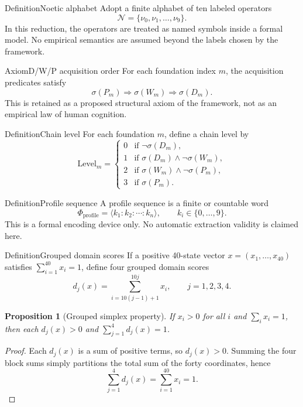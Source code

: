 \documentclass[11pt]{article}
\newcommand{\Noetics}{\mathcal{N}}
\newcommand{\noe}[1]{\nu_{#1}}
\newcommand{\ProfileFrac}{\Phi_{\mathrm{profile}}}
\theoremstyle{plain}
\newtheorem{proposition}{Proposition}
\begin{document}
\begin{claimbox}{Definition}{Noetic alphabet}
Adopt a finite alphabet of ten labeled operators
\[
\Noetics = \{\noe{0},\noe{1},\ldots,\noe{9}\}.
\]
In this reduction, the operators are treated as named symbols inside a formal
model. No empirical semantics are assumed beyond the labels chosen by the
framework.
\end{claimbox}

\begin{claimbox}{Axiom}{D/W/P acquisition order}
For each foundation index $m$, the acquisition predicates satisfy
\[
\sigma(P_m)\Rightarrow \sigma(W_m)\Rightarrow \sigma(D_m).
\]
This is retained as a proposed structural axiom of the framework, not as an
empirical law of human cognition.
\end{claimbox}

\begin{claimbox}{Definition}{Chain level}
For each foundation $m$, define a chain level by
\[
\mathrm{Level}_m =
\begin{cases}
0 & \text{if } \neg \sigma(D_m),\\
1 & \text{if } \sigma(D_m)\land \neg \sigma(W_m),\\
2 & \text{if } \sigma(W_m)\land \neg \sigma(P_m),\\
3 & \text{if } \sigma(P_m).
\end{cases}
\]
\end{claimbox}

\begin{claimbox}{Definition}{Profile sequence}
A profile sequence is a finite or countable word
\[
\ProfileFrac = \langle k_1:k_2:\cdots:k_n\rangle,\qquad k_i\in\{0,\ldots,9\}.
\]
This is a formal encoding device only. No automatic extraction validity is
claimed here.
\end{claimbox}

\begin{claimbox}{Definition}{Grouped domain scores}
If a positive 40-state vector $x=(x_1,\ldots,x_{40})$ satisfies
$\sum_{i=1}^{40}x_i=1$, define four grouped domain scores
\[
d_j(x)=\sum_{i=10(j-1)+1}^{10j}x_i,\qquad j=1,2,3,4.
\]
\end{claimbox}

\begin{proposition}[Grouped simplex property]
If $x_i>0$ for all $i$ and $\sum_i x_i=1$, then each $d_j(x)>0$ and
$\sum_{j=1}^{4} d_j(x)=1$.
\end{proposition}

\begin{proof}
Each $d_j(x)$ is a sum of positive terms, so $d_j(x)>0$. Summing the four block
sums simply partitions the total sum of the forty coordinates, hence
\[
\sum_{j=1}^{4}d_j(x)=\sum_{i=1}^{40}x_i=1.
\]
\end{proof}
\end{document}
